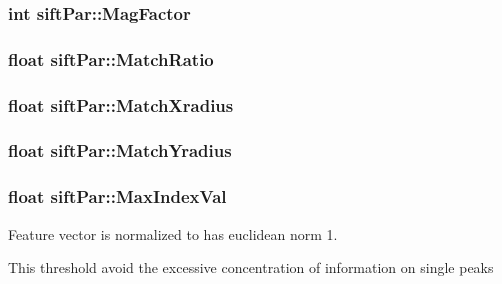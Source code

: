 \subsubsection[{Mag\+Factor}]{\setlength{\rightskip}{0pt plus 5cm}int sift\+Par\+::\+Mag\+Factor}\label{structsiftPar_a109497281d3cf382c11f81ead9d5744a}
\hypertarget{structsiftPar_aa8720a4bdd0384b43952124af21d8406}{}
\subsubsection[{Match\+Ratio}]{\setlength{\rightskip}{0pt plus 5cm}float sift\+Par\+::\+Match\+Ratio}\label{structsiftPar_aa8720a4bdd0384b43952124af21d8406}
\hypertarget{structsiftPar_a5592a6b75bffce553745a432dc057a90}{}
\subsubsection[{Match\+Xradius}]{\setlength{\rightskip}{0pt plus 5cm}float sift\+Par\+::\+Match\+Xradius}\label{structsiftPar_a5592a6b75bffce553745a432dc057a90}
\hypertarget{structsiftPar_aba2f2be641556c326a55c21b17b5acdd}{}
\subsubsection[{Match\+Yradius}]{\setlength{\rightskip}{0pt plus 5cm}float sift\+Par\+::\+Match\+Yradius}\label{structsiftPar_aba2f2be641556c326a55c21b17b5acdd}
\hypertarget{structsiftPar_ad2e4baf0901418c70017d26d9504f72b}{}
\subsubsection[{Max\+Index\+Val}]{\setlength{\rightskip}{0pt plus 5cm}float sift\+Par\+::\+Max\+Index\+Val}\label{structsiftPar_ad2e4baf0901418c70017d26d9504f72b}


Feature vector is normalized to has euclidean norm 1. 

This threshold avoid the excessive concentration of information on single peaks \hypertarget{structsiftPar_ac2b95a0473b30122b503481b09ff2f05}{}
